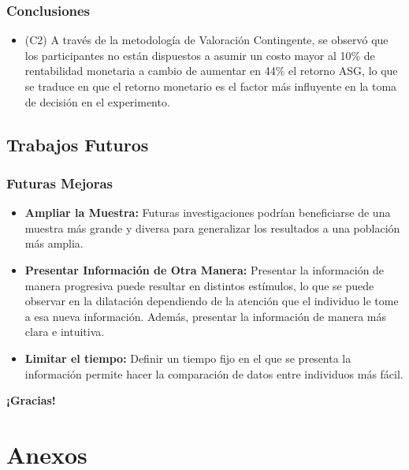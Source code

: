 \documentclass{beamer}
\begin{document}
\begin{frame}
    \frametitle{Conclusiones}
    \begin{itemize}
        
        \item (C2) A través de la metodología de Valoración Contingente, se observó que los participantes no están dispuestos a asumir un costo mayor al 10\% de rentabilidad monetaria a cambio de aumentar en 44\% el retorno ASG, lo que se traduce en que el retorno monetario es el factor más influyente en la toma de decisión en el experimento. 
    \end{itemize}
\end{frame}


\subsection{Trabajos Futuros}
\begin{frame}
    \frametitle{Futuras Mejoras}
    \begin{itemize}
        \item \textbf{Ampliar la Muestra:} Futuras investigaciones podrían beneficiarse de una muestra más grande y diversa para generalizar los resultados a una población más amplia. 
        
        \item \textbf{Presentar Información de Otra Manera:} Presentar la información de manera progresiva puede resultar en distintos estímulos, lo que se puede observar en la dilatación dependiendo de la atención que el individuo le tome a esa nueva información. Además, presentar la información de manera más clara e intuitiva. 
        
        \item \textbf{Limitar el tiempo:} Definir un tiempo fijo en el que se presenta la información permite hacer la comparación de datos entre individuos más fácil.
    \end{itemize}
\end{frame}

\begin{frame}
\centering
    \huge \textbf{¡Gracias!}
\end{frame}



\section{Anexos}
\end{document}
